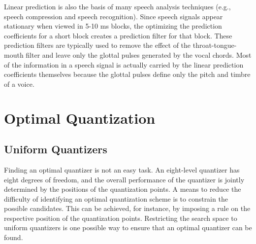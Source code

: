 Linear prediction is also the basis of many speech analysis techniques (e.g., speech compression and speech recognition).
Since speech signals appear stationary when viewed in 5-10 ms blocks, the optimizing the prediction coefficients for a short block creates a prediction filter for that block.
These prediction filters are typically used to remove the effect of the throat-tongue-mouth filter and leave only the glottal pulses generated by the vocal chords.
Most of the information in a speech signal is actually carried by the linear prediction coefficients themselves because the glottal pulses define only the pitch and timbre of a voice.

\section{Optimal Quantization}

\subsection{Uniform Quantizers}
\label{section:UniformQuantizers}

Finding an optimal quantizer is not an easy task.
An eight-level quantizer has eight degrees of freedom, and the overall performance of the quantizer is jointly determined by the positions of the quantization points.
A means to reduce the difficulty of identifying an optimal quantization scheme is to constrain the possible candidates.
This can be achieved, for instance, by imposing a rule on the respective position of the quantization points.
Restricting the search space to uniform quantizers is one possible way to ensure that an optimal quantizer can be found.

